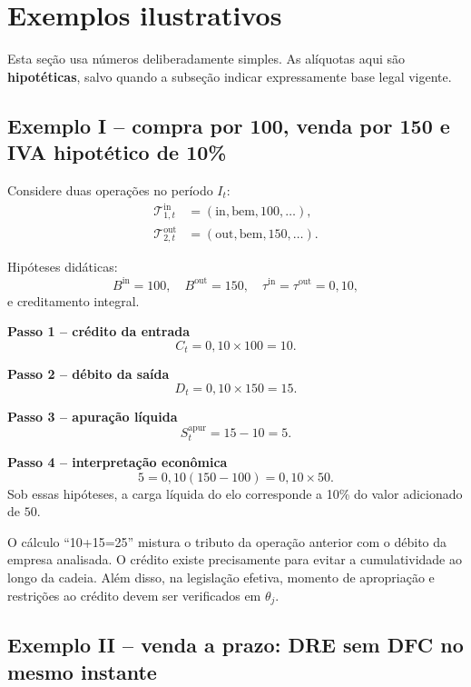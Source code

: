 \documentclass[11pt,a4paper]{article}
\newcommand{\cT}{\mathcal{T}}
\begin{document}
\section{Exemplos ilustrativos}

Esta seção usa números deliberadamente simples. As alíquotas aqui são \textbf{hipotéticas}, salvo quando a subseção indicar expressamente base legal vigente.

\subsection{Exemplo I -- compra por 100, venda por 150 e IVA hipotético de 10\%}

Considere duas operações no período $I_t$:
\begin{align*}
\cT_{1,t}^{\mathrm{in}}&=(\mathrm{in},\mathrm{bem},100,\ldots),\\
\cT_{2,t}^{\mathrm{out}}&=(\mathrm{out},\mathrm{bem},150,\ldots).
\end{align*}

Hipóteses didáticas:
\[
B^{\mathrm{in}}=100,
\quad
B^{\mathrm{out}}=150,
\quad
\tau^{\mathrm{in}}=\tau^{\mathrm{out}}=0{,}10,
\]
e creditamento integral.

\textbf{Passo 1 -- crédito da entrada}
\[
C_t=0{,}10\times 100=10.
\]

\textbf{Passo 2 -- débito da saída}
\[
D_t=0{,}10\times 150=15.
\]

\textbf{Passo 3 -- apuração líquida}
\[
S_t^{\mathrm{apur}}=15-10=5.
\]

\textbf{Passo 4 -- interpretação econômica}
\[
5=0{,}10(150-100)=0{,}10\times 50.
\]
Sob essas hipóteses, a carga líquida do elo corresponde a 10\% do valor adicionado de $50$.

\begin{cuidado}
O cálculo ``10+15=25'' mistura o tributo da operação anterior com o débito da empresa analisada. O crédito existe precisamente para evitar a cumulatividade ao longo da cadeia. Além disso, na legislação efetiva, momento de apropriação e restrições ao crédito devem ser verificados em $\theta_j$.
\end{cuidado}

\subsection{Exemplo II -- venda a prazo: DRE sem DFC no mesmo instante}
\end{document}
